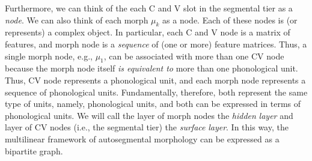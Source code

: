 
Furthermore, we can think of the each C and V slot in the segmental tier as a \emph{node}.
We can also think of each morph $\mu_k$ as a node. 
 Each of these nodes is (or represents) a complex object. In particular, each C and V node
 is a matrix of features, and morph node is a \emph{sequence} of (one or more) feature matrices. Thus, a single morph node, e.g., $\mu_1$, can be associated with more than one CV node because the morph node itself \emph{is equivalent to} more than one phonological unit.  
Thus, CV node represents a phonological unit, and each morph node represents a sequence of phonological units.
Fundamentally, therefore, both represent the same type of units, namely, phonological units, and both can be expressed in terms of phonological units.
We will call the layer of  morph nodes the \emph{hidden} \emph{layer} and layer of CV nodes (i.e., the segmental tier) the \emph{surface} \emph{layer}. 
In this way, the multilinear framework of autosegmental morphology can be expressed as a bipartite graph.


